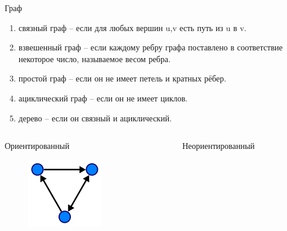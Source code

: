 \documentclass[10pt]{beamer}
\begin{document}
\begin{frame}{Граф}
\begin{enumerate}
\item связный граф -- если для любых вершин u,v есть путь из u в v.
\item взвешенный граф -- если каждому ребру графа поставлено в соответствие некоторое число, называемое весом ребра.
\item простой граф -- если он не имеет петель и кратных рёбер.
\item ациклический граф -- если он не имеет циклов.
\item дерево -- если он связный и ациклический.
\end{enumerate}
\begin{columns}
	\begin{column}{.3\linewidth}
		Ориентированный
		\begin{figure}
		\centerline{\includegraphics[width=1.0\linewidth]{images/und_graph.png}}
		\end{figure}
	\end{column}
	\begin{column}{.3\linewidth}
		Неориентированный
		\begin{figure}

\end{figure}
\end{column}
\end{columns}
\end{frame}
\end{document}
